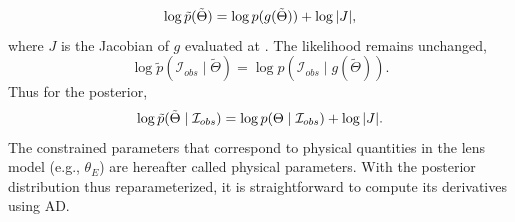 \begin{equation}
    \log \tilde{p}(\tilde{\Theta}) = \log p(g(\tilde{\Theta})) + \log \abs{J},
\end{equation}
where $J$ is the Jacobian of $g$ evaluated at \agu{$\tilde{\Theta}$}.
The likelihood remains unchanged,
\begin{equation}
    \log \tilde{p}(\mathcal{I}_{obs} \mid \tilde{\Theta}) = \log p(\mathcal{I}_{obs} \mid g(\tilde{\Theta})).
\end{equation}
Thus for the posterior,
\begin{equation}
    \log \tilde{p}(\tilde{\Theta} \mid \mathcal{I}_{obs}) = \log p(\Theta \mid \mathcal{I}_{obs}) + \log \abs{J}. \label{eqn:reparam-post}
\end{equation}
The constrained parameters that correspond to physical quantities in the lens model (e.g., $\theta_E$) are hereafter called physical parameters.
With the posterior distribution thus reparameterized, it is straightforward to compute its derivatives using AD.



